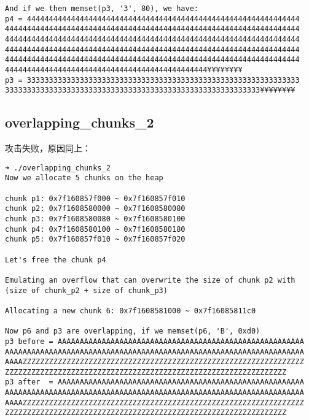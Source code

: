 \begin{verbatim}
And if we then memset(p3, '3', 80), we have:
p4 = 44444444444444444444444444444444444444444444444444444444444444
4444444444444444444444444444444444444444444444444444444444444444444
4444444444444444444444444444444444444444444444444444444444444444444
4444444444444444444444444444444444444444444444444444444444444444444
4444444444444444444444444444444444444444444444444444444444444444444
4444444444444444444444444444444444444444444444¥¥¥¥¥¥¥¥
p3 = 33333333333333333333333333333333333333333333333333333333333333
3333333333333333333333333333333333333333333333333333333333¥¥¥¥¥¥¥¥
\end{verbatim}

\subsection{overlapping\_chunks\_2}

攻击失败，原因同上：
\begin{verbatim}
➜ ./overlapping_chunks_2
Now we allocate 5 chunks on the heap

chunk p1: 0x7f160857f000 ~ 0x7f160857f010
chunk p2: 0x7f1608580000 ~ 0x7f1608580080
chunk p3: 0x7f1608580080 ~ 0x7f1608580100
chunk p4: 0x7f1608580100 ~ 0x7f1608580180
chunk p5: 0x7f160857f010 ~ 0x7f160857f020

Let's free the chunk p4

Emulating an overflow that can overwrite the size of chunk p2 with (size of chunk_p2 + size of chunk_p3)

Allocating a new chunk 6: 0x7f1608581000 ~ 0x7f16085811c0

Now p6 and p3 are overlapping, if we memset(p6, 'B', 0xd0)
p3 before = AAAAAAAAAAAAAAAAAAAAAAAAAAAAAAAAAAAAAAAAAAAAAAAAAAAAAAAA
AAAAAAAAAAAAAAAAAAAAAAAAAAAAAAAAAAAAAAAAAAAAAAAAAAAAAAAAAAAAAAAAAAAA
AAAAZZZZZZZZZZZZZZZZZZZZZZZZZZZZZZZZZZZZZZZZZZZZZZZZZZZZZZZZZZZZZZZZ
ZZZZZZZZZZZZZZZZZZZZZZZZZZZZZZZZZZZZZZZZZZZZZZZZZZZZZZZZZZZZZZZZ
p3 after  = AAAAAAAAAAAAAAAAAAAAAAAAAAAAAAAAAAAAAAAAAAAAAAAAAAAAAAAA
AAAAAAAAAAAAAAAAAAAAAAAAAAAAAAAAAAAAAAAAAAAAAAAAAAAAAAAAAAAAAAAAAAAA
AAAAZZZZZZZZZZZZZZZZZZZZZZZZZZZZZZZZZZZZZZZZZZZZZZZZZZZZZZZZZZZZZZZZ
ZZZZZZZZZZZZZZZZZZZZZZZZZZZZZZZZZZZZZZZZZZZZZZZZZZZZZZZZZZZZZZZZ
\end{verbatim}

\newpage